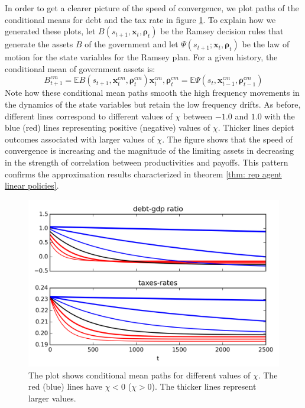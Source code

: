 \documentclass[thmsb,11pt]{article}
\begin{document}
In order to get a clearer picture of the speed of convergence, we plot  paths of the conditional means for debt and the  tax rate in figure \ref{fig:speed_of_convergence}.
To explain how we generated these plots, let $B(s_{t+1},\bm x_t, \bm \rho_t)$ be the Ramsey decision rules
that generate the assets $B$ of the government and let $\Psi \left( s_{t+1};\bm{x}_t,\bm{\rho }_t\right)$ be the law of motion for the state variables for the Ramsey plan.
For a given history, the conditional mean of government assets is:
\begin{subequations}
\begin{equation}
B^{cm}_{t+1}=\mathbb{E}B(s_{t+1},\bm x^{cm}_t,\bm \rho^{cm}_{t})
\end{equation}
 \begin{equation}
 \bm x^{cm}_t,\bm \rho^{cm}_{t}=\mathbb{E}\Psi (s_{t}, \bm x^{cm}_{t-1},\bm \rho^{cm}_{t-1})
 \end{equation}
\end{subequations}
Note how these conditional mean  paths smooth the high frequency movements in the dynamics of the state variables but retain the low frequency drifts.
 As before,  different lines correspond to  different values of $\chi$ between $-1.0$ and $1.0$ with the blue (red) lines representing positive (negative) values of $\chi$.
 Thicker  lines depict outcomes associated with larger values of $\chi$. The figure  shows that the speed of convergence is increasing and the magnitude of the limiting assets in decreasing
 in the strength of correlation between productivities and payoffs. This pattern  confirms the approximation results characterized in theorem \ref{thm: rep agent linear policies}.

 {
  \begin{figure}
  \label{fig:speed_of_convergence}
    \centering
    \includegraphics[width = .9\textwidth]{cesplots/speed_of_convergence.png}
    \caption{The plot shows conditional mean paths for different values of $\chi$. The red (blue) lines have $\chi<0$ ($\chi>0$). The thicker lines represent larger values.}
  \end{figure}

}
\end{document}
